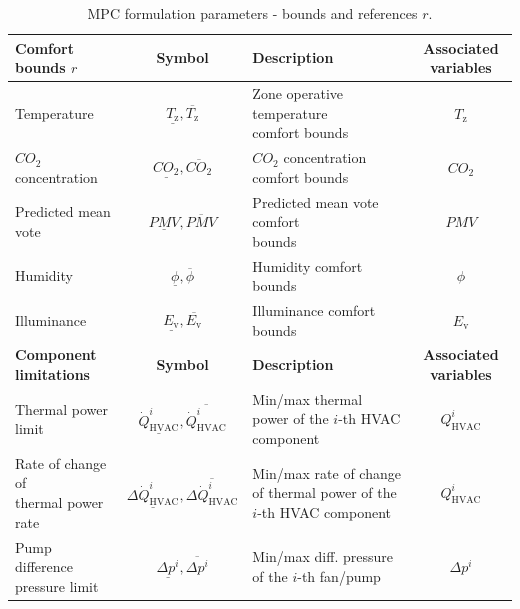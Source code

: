 \documentclass[10pt]{article}
\begin{document}
\renewcommand{\arraystretch}{2}
\begin{table}[ht]
	\centering
	\caption{MPC formulation parameters - bounds and references $r$.}
	\label{tab:mpc_form:parameters:bounds}
		\begin{adjustwidth}{-1.5cm}{}
	\begin{tabular}{l|c|l|c}
		\toprule
		\textbf{Comfort bounds $r$}  & \textbf{Symbol} &  \textbf{Description} & \textbf{Associated variables} \\
		\midrule
		Temperature & $\underline{T_{\text{z}}},\overline{T_{\text{z}}}$ & \makecell[l]{Zone operative temperature  \\ comfort bounds } & $T_{\text{z}}$ \\
		$CO_2$ concentration & $\underline{CO_2},\overline{CO_2}$ & \makecell[l]{$CO_2$ concentration comfort \\ bounds} & $CO_{2}$ \\
		Predicted mean vote & $\underline{PMV},\overline{PMV}$ &  \makecell[l]{Predicted mean vote comfort \\ bounds} & $PMV$ \\
		Humidity & $\underline{\phi},\overline{\phi}$ &  Humidity comfort bounds & $\phi$  \\
		Illuminance & $\underline{E_{\text{v}}},\overline{E_{\text{v}}}$ & Illuminance comfort bounds & $E_{\text{v}}$  \\
		\bottomrule 
		\textbf{Component limitations}  & \textbf{Symbol} &  \textbf{Description} & \textbf{Associated variables} \\
		\midrule
		Thermal power limit & $\underline{\dot{Q}^i_{\text{HVAC}}},\overline{\dot{Q}^i_{\text{HVAC}}}$ & \makecell[l]{Min/max thermal power of \\ the $i$-th HVAC component} & $Q^i_{\text{HVAC}}$ \\
		\makecell[l]{Rate of change of\\ thermal power rate}  & $\underline{\Delta \dot{Q}^i_{\text{HVAC}}},\overline{\Delta \dot{Q}^i_{\text{HVAC}}}$ & \makecell[l]{Min/max rate of change of  thermal  \\ power  of the  $i$-th HVAC component} & $Q^i_{\text{HVAC}}$ \\
		\makecell[l]{Pump difference\\ pressure limit}   & $\underline{\Delta p^i},\overline{\Delta p^i}$ & \makecell[l]{Min/max diff. pressure \\  of the  $i$-th fan/pump} & $\Delta p^i$ \\

\end{tabular}
\end{adjustwidth}
\end{table}
\end{document}

